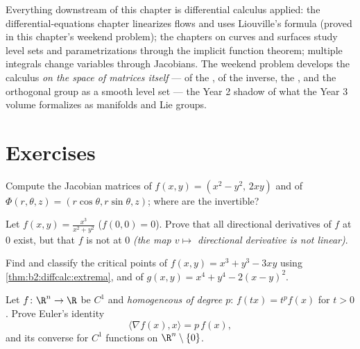 \begin{remark}
Everything downstream of this chapter is differential calculus
applied: the differential-equations chapter linearizes flows and
uses Liouville's  formula (proved in this chapter's
weekend problem); the chapters on curves and surfaces study
level sets and parametrizations through the implicit function
theorem; multiple integrals change variables through Jacobians.
The weekend problem develops the calculus \emph{on the space of
matrices itself} ---  of the , of the
inverse, the , and the orthogonal group as a
smooth level set --- the Year 2 shadow of what the Year 3
volume formalizes as manifolds and Lie groups.
\end{remark}

\section{Exercises}

\begin{exercise}[$\star$]\label{exo:b2:diffcalc:1}
Compute the Jacobian matrices of $f(x,y) = (x^2 - y^2,\, 2xy)$ and
of $\Phi(r,\theta,z) = (r\cos\theta, r\sin\theta, z)$; where are
the  invertible?
\end{exercise}

\begin{exercise}[$\star$]\label{exo:b2:diffcalc:2}
Let $f(x,y) = \frac{x^3}{x^2 + y^2}$ ($f(0,0) = 0$). Prove that all
directional derivatives of $f$ at $0$ exist, but that $f$ is not
 at $0$ \emph{(the map $v \mapsto$ directional
derivative is not linear)}.
\end{exercise}

\begin{exercise}[$\star$]\label{exo:b2:diffcalc:3}
Find and classify the critical points of $f(x, y) = x^3 + y^3 -
3xy$ using \cref{thm:b2:diffcalc:extrema}, and of $g(x,y) = x^4 +
y^4 - 2(x - y)^2$.
\end{exercise}

\begin{exercise}[$\star\star$]\label{exo:b2:diffcalc:4}
Let $f \colon \R^n \to \R$ be $C^1$ and \emph{homogeneous of degree
$p$}: $f(tx) = t^pf(x)$ for $t > 0$. Prove Euler's identity
\[
\langle \nabla f(x), x\rangle = p\,f(x) ,
\]
and its converse for $C^1$ functions on $\R^n\setminus\{0\}$.
\end{exercise}


